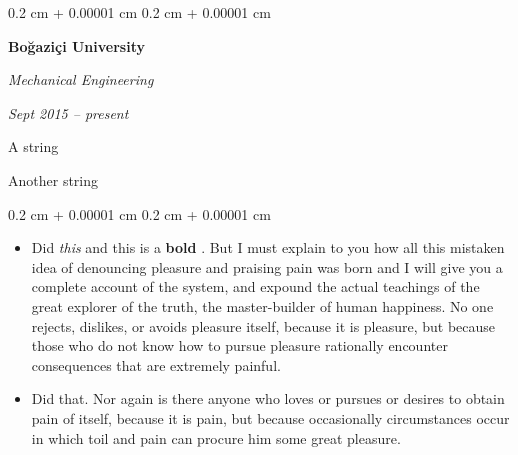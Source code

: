 \documentclass[10pt, letterpaper]{article}
\newenvironment{summary}{
    \begin{description}[
        topsep=0.10 cm,
        parsep=0.10 cm,
        partopsep=0pt,
        itemsep=0pt,
        leftmargin=0.4 cm + 10pt
    ]
}{
    \end{description}
} %
\newenvironment{highlights}{
    \begin{itemize}[
        topsep=0.10 cm,
        parsep=0.10 cm,
        partopsep=0pt,
        itemsep=0pt,
        leftmargin=0.4 cm + 10pt
    ]
}{
    \end{itemize}
} %
\newenvironment{onecolentry}{
    \begin{adjustwidth}{
        0.2 cm + 0.00001 cm
    }{
        0.2 cm + 0.00001 cm
    }
}{
    \end{adjustwidth}
} %
\newenvironment{twocolentry}[2][]{
    \onecolentry
    \def\secondColumn{#2}
    \setcolumnwidth{\fill, 4.5 cm}
    \begin{paracol}{2}
}{
    \switchcolumn \raggedleft \secondColumn
    \end{paracol}
    \endonecolentry
} %
\let\hrefWithoutArrow\href
\renewcommand{\href}[2]{\hrefWithoutArrow{#1}{\ifthenelse{\equal{#2}{}}{ }{#2 }\raisebox{.15ex}{\footnotesize \faExternalLink*}}}
\begin{document}
        \begin{twocolentry}{
            
            
        \textit{Sept 2015 – present}}
            \textbf{Boğaziçi University}

            \textit{Mechanical Engineering}
        \end{twocolentry}
            \begin{summary}
                \item A string
                \item Another string
            \end{summary}
        \vspace{0.10 cm}
        \begin{onecolentry}
            \begin{highlights}
                \item Did \textit{this} and this is a \textbf{bold} \href{https://example.com}{link}. But I must explain to you how all this mistaken idea of denouncing pleasure and praising pain was born and I will give you a complete account of the system, and expound the actual teachings of the great explorer of the truth, the master-builder of human happiness. No one rejects, dislikes, or avoids pleasure itself, because it is pleasure, but because those who do not know how to pursue pleasure rationally encounter consequences that are extremely painful.
                \item Did that. Nor again is there anyone who loves or pursues or desires to obtain pain of itself, because it is pain, but because occasionally circumstances occur in which toil and pain can procure him some great pleasure.
            \end{highlights}
        \end{onecolentry}


        \vspace{0.2 cm}
\end{document}
